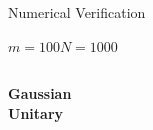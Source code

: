 \documentclass[8pt]{beamer}
\begin{document}
\begin{frame}{Numerical Verification}

  \textbf{\hspace{27ex}$m=100$\hspace{17ex}$N=1000$}
  \begin{columns}
    \begin{column}{0.15\textwidth}
      \vspace{15ex}
      \textbf{Gaussian}\\
      \vspace{5ex}
      \textbf{Unitary}\\
    \end{column}
    \begin{column}{0.85\textwidth}
      \setcounter{subfigure}{0}
      \begin{figure}
        \begin{center}
\end{center}
\end{figure}
\end{column}
\end{columns}
\end{frame}
\end{document}
